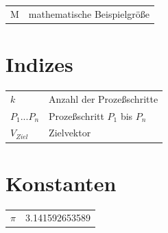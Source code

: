 \begin{tabularx}{\textwidth}{p{}X}
$\mathrm{M}$ & mathematische Beispielgröße \\
\end{tabularx}

\section*{Indizes}

\begin{tabularx}{\textwidth}{p{}X}
$k$ & Anzahl der Prozeßschritte \\
$P_{1}...P_{n}$ & Prozeßschritt $P_{1}$ bis $P_{n}$\\
$V_{Ziel}$ &  Zielvektor\\
\end{tabularx}

\section*{Konstanten}

\begin{tabularx}{\textwidth}{p{}X}
$\pi$ & 3.141592653589 \\
\end{tabularx}